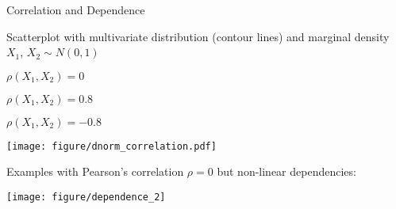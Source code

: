 \documentclass[11pt,compress,t,notes=noshow, aspectratio=169, xcolor=table]{beamer}
\begin{document}
\begin{frame}{Correlation and Dependence}

Scatterplot with multivariate distribution (contour lines) and marginal density $X_1$, $X_2 \sim N(0,1)$ 

\begin{center}
\begin{minipage}[t]{0.3\textwidth}
\centering
 $\rho(X_1, X_2) = 0$
\end{minipage}
\begin{minipage}[t]{0.3\textwidth}
\centering
 $\rho(X_1, X_2) = 0.8$
\end{minipage}
\begin{minipage}[t]{0.3\textwidth}
\centering
 $\rho(X_1, X_2) = -0.8$
\end{minipage}
\texttt{[image: figure/dnorm\_correlation.pdf]}
\end{center}

\pause

Examples with Pearson's correlation $\rho = 0$ but non-linear dependencies:

\centering
\texttt{[image: figure/dependence\_2]}
\end{frame}
\end{document}
